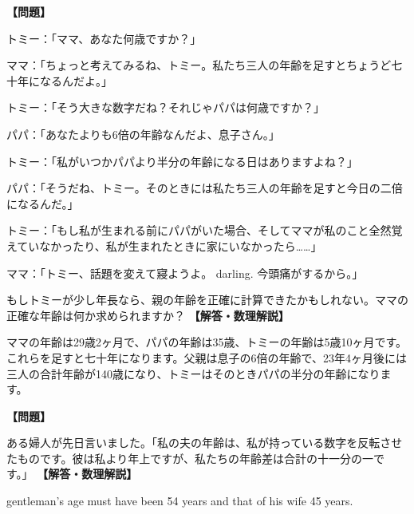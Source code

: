 \documentclass[10pt,a4paper,oneside,openany]{ltjsbook}
\begin{document}
\begin{tcolorbox}[colback=softblue,colframe=primaryblue,title=\textbf{第 40 問：ママの年齢 （原題: MAMMA'S AGE.）},arc=2mm,boxrule=1pt,breakable]
\textbf{【問題】}\par\vspace{0.3em}
トミー：「ママ、あなた何歳ですか？」

ママ：「ちょっと考えてみるね、トミー。私たち三人の年齢を足すとちょうど七十年になるんだよ。」

トミー：「そう大きな数字だね？それじゃパパは何歳ですか？」

パパ：「あなたよりも6倍の年齢なんだよ、息子さん。」

トミー：「私がいつかパパより半分の年齢になる日はありますよね？」

パパ：「そうだね、トミー。そのときには私たち三人の年齢を足すと今日の二倍になるんだ。」

トミー：「もし私が生まれる前にパパがいた場合、そしてママが私のこと全然覚えていなかったり、私が生まれたときに家にいなかったら……」

ママ：「トミー、話題を変えて寢ようよ。 darling. 今頭痛がするから。」

もしトミーが少し年長なら、親の年齢を正確に計算できたかもしれない。ママの正確な年齢は何か求められますか？
\tcblower
\textbf{【解答・数理解説】}\par\vspace{0.3em}
ママの年齢は29歳2ヶ月で、パパの年齢は35歳、トミーの年齢は5歳10ヶ月です。これらを足すと七十年になります。父親は息子の6倍の年齢で、23年4ヶ月後には三人の合計年齢が140歳になり、トミーはそのときパパの半分の年齢になります。
\end{tcolorbox}

\begin{tcolorbox}[colback=softblue,colframe=primaryblue,title=\textbf{第 41 問：彼らの年齢 （原題: THEIR AGES.）},arc=2mm,boxrule=1pt,breakable]
\textbf{【問題】}\par\vspace{0.3em}
ある婦人が先日言いました。「私の夫の年齢は、私が持っている数字を反転させたものです。彼は私より年上ですが、私たちの年齢差は合計の十一分の一です。」
\tcblower
\textbf{【解答・数理解説】}\par\vspace{0.3em}
gentleman's age must have been 54 years and that of his wife 45 years.
\end{tcolorbox}
\end{document}
